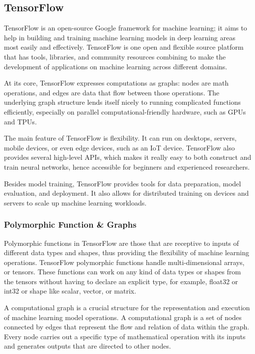 \documentclass[a4paper]{report}
\begin{document}
{\subsection{TensorFlow}
TensorFlow is an open-source Google framework for machine learning; it aims to help in building and training machine learning models in deep learning areas most easily and effectively. TensorFlow is one open and flexible source platform that has tools, libraries, and community resources combining to make the development of applications on machine learning across different domains.

At its core, TensorFlow expresses computations as graphs: nodes are math operations, and edges are data that flow between those operations. The underlying graph structure lends itself nicely to running complicated functions efficiently, especially on parallel computational-friendly hardware, such as GPUs and TPUs.

The main feature of TensorFlow is flexibility. It can run on desktops, servers, mobile devices, or even edge devices, such as an IoT device. TensorFlow also provides several high-level APIs, which makes it really easy to both construct and train neural networks, hence accessible for beginners and experienced researchers.

Besides model training, TensorFlow provides tools for data preparation, model evaluation, and deployment. It also allows for distributed training on devices and servers to scale up machine learning workloads.
\subsubsection{Polymorphic Function \& Graphs}

Polymorphic functions in TensorFlow are those that are receptive to inputs of different data types and shapes, thus providing the flexibility of machine learning operations. TensorFlow polymorphic functions handle multi-dimensional arrays, or tensors. These functions can work on any kind of data types or shapes from the tensors without having to declare an explicit type, for example, float32 or int32 or shape like scalar, vector, or matrix.

A computational graph is a crucial structure for the representation and execution of machine learning model operations. A computational graph is a set of nodes connected by edges that represent the flow and relation of data within the graph. Every node carries out a specific type of mathematical operation with its inputs and generates outputs that are directed to other nodes.

}
\end{document}
